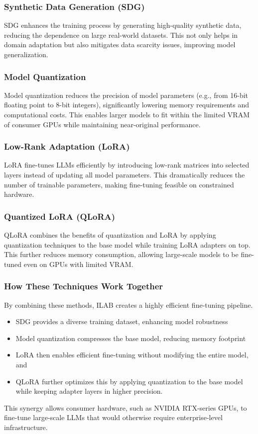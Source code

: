 \documentclass[12pt]{article}
\begin{document}
\subsubsection{Synthetic Data Generation (SDG)}
SDG enhances the training process by generating high-quality synthetic data, reducing the dependence on large real-world datasets. This not only helps in domain adaptation but also mitigates data scarcity issues, improving model generalization.

\subsubsection{Model Quantization}
Model quantization reduces the precision of model parameters (e.g., from 16-bit floating point to 8-bit integers), significantly lowering memory requirements and computational costs. This enables larger models to fit within the limited VRAM of consumer GPUs while maintaining near-original performance.

\subsubsection{Low-Rank Adaptation (LoRA)}
LoRA fine-tunes LLMs efficiently by introducing low-rank matrices into selected layers instead of updating all model parameters. This dramatically reduces the number of trainable parameters, making fine-tuning feasible on constrained hardware.

\subsubsection{Quantized LoRA (QLoRA)}
QLoRA combines the benefits of quantization and LoRA by applying quantization techniques to the base model while training LoRA adapters on top. This further reduces memory consumption, allowing large-scale models to be fine-tuned even on GPUs with limited VRAM.

\subsubsection{How These Techniques Work Together}
By combining these methods, ILAB creates a highly efficient fine-tuning pipeline.
\begin{itemize}
    \item SDG provides a diverse training dataset, enhancing model robustness
    \item Model quantization compresses the base model, reducing memory footprint
    \item LoRA then enables efficient fine-tuning without modifying the entire model, and
    \item QLoRA further optimizes this by applying quantization to the base model while keeping adapter layers in higher precision.
\end{itemize}
This synergy allows consumer hardware, such as NVIDIA RTX-series GPUs, to fine-tune large-scale LLMs that would otherwise require enterprise-level infrastructure.
\end{document}
